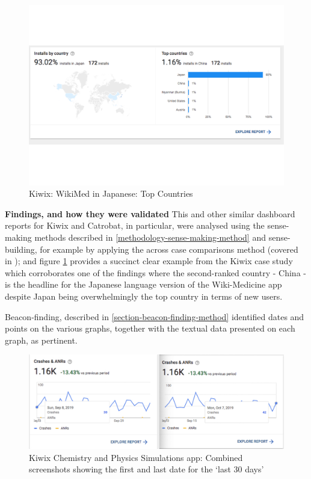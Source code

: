 \begin{figure}
    \centering
    \includegraphics{images/android-vitals-screenshots/kiwix/wikimed-japan-top-countries.pdf}
    \caption{Kiwix: WikiMed in Japanese: Top Countries}
    \label{fig:wikimed-japan-top-countries}
\end{figure}


\textbf{Findings, and how they were validated}
This and other similar dashboard reports for Kiwix and Catrobat, in particular, were analysed using the sense-making methods described in \ref{methodology-sense-making-method} and sense-building, for example by applying the across case comparisons method (covered in ); and  
figure \ref{fig:wikimed-japan-top-countries} provides a succinct clear example from the Kiwix case study which corroborates one of the findings where the second-ranked country - China - is the headline for the Japanese language version of the Wiki-Medicine app despite Japan being overwhelmingly the top country in terms of new users. 

Beacon-finding, described in \ref{section-beacon-finding-method} identified dates and points on the various graphs, together with the textual data presented on each graph, as pertinent. 

\begin{figure}
    \centering
    \includegraphics{images/android-vitals-screenshots/kiwix/phet_combined_screenshots_crashes_and_anrs_08_sep_to_07_oct_2019.jpg}
    \caption{Kiwix Chemistry and Physics Simulations app: Combined screenshots showing the first and last date for the `last 30 days'}
    \label{fig:phet_combined_screenshots_crashes_and_anrs_08_sep_to_07_oct_2019}
\end{figure}

